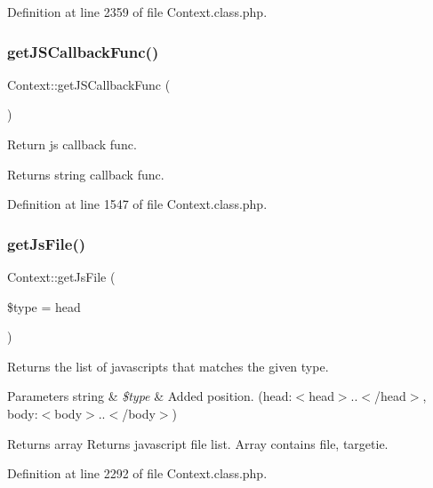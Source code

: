 Definition at line 2359 of file Context.\+class.\+php.

\mbox{\label{classContext_ab2e157a87d2b960d78b2c3f35ae7da23}} 
\subsubsection{\texorpdfstring{get\+J\+S\+Callback\+Func()}{getJSCallbackFunc()}}
{\footnotesize\ttfamily Context\+::get\+J\+S\+Callback\+Func (\begin{DoxyParamCaption}{ }\end{DoxyParamCaption})}

Return js callback func. \begin{DoxyReturn}{Returns}
string callback func. 
\end{DoxyReturn}


Definition at line 1547 of file Context.\+class.\+php.

\mbox{\label{classContext_a9989fb9f7be0a978df65e50462460317}} 
\subsubsection{\texorpdfstring{get\+Js\+File()}{getJsFile()}}
{\footnotesize\ttfamily Context\+::get\+Js\+File (\begin{DoxyParamCaption}\item[{}]{\$type = {\ttfamily \textquotesingle{}head\textquotesingle{}} }\end{DoxyParamCaption})}

Returns the list of javascripts that matches the given type.


\begin{DoxyParams}[1]{Parameters}
string & {\em \$type} & Added position. (head\+:$<$head$>$..$<$/head$>$, body\+:$<$body$>$..$<$/body$>$) \\
\hline
\end{DoxyParams}
\begin{DoxyReturn}{Returns}
array Returns javascript file list. Array contains file, targetie. 
\end{DoxyReturn}


Definition at line 2292 of file Context.\+class.\+php.

